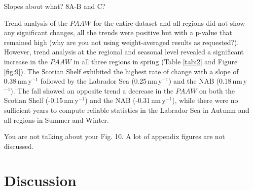 \documentclass[utf8]{frontiersSCNS} %
\begin{document}

Slopes about what? 8A-B and C?

Trend analysis of the $PAAW$ for the entire dataset and all regions did not show any significant changes, all the trends were positive but with a p-value that remained high (why are you not using weight-averaged results as requested?). However, trend analysis at the regional and seasonal level revealed a significant increase in the $PAAW$ in all three regions in spring (Table \ref{tab:2} and Figure \ref{fig:9}). The Scotian Shelf exhibited the highest rate of change with a slope of 0.38\,nm\,y$^{-1}$ followed by the Labrador Sea (0.25\,nm\,y$^{-1}$) and the NAB (0.18\,nm\,y$^{-1}$). The fall showed an opposite trend a decrease in the $PAAW$ on both the Scotian Shelf (-0.15\,nm\,y$^{-1}$) and the NAB (-0.31\,nm\,y$^{-1}$), while there were no sufficient years to compute reliable statistics in the Labrador Sea in Autumn and all regions in Summer and Winter. 

You are not talking about your Fig. 10. A lot of appendix figures are not discussed.

\section{Discussion}
\end{document}
